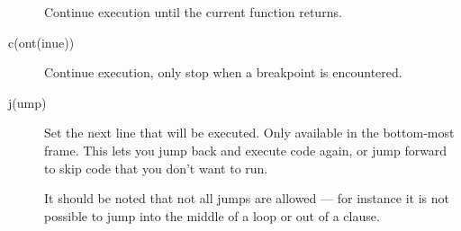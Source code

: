 \begin{description}
Continue execution until the current function returns.

\item[c(ont(inue))]

Continue execution, only stop when a breakpoint is encountered.

\item[j(ump) \var{lineno}]

Set the next line that will be executed.  Only available in the
bottom-most frame.  This lets you jump back and execute code
again, or jump forward to skip code that you don't want to run.

It should be noted that not all jumps are allowed --- for instance it
is not possible to jump into the middle of a  loop or out
of a  clause.
\end{description}

